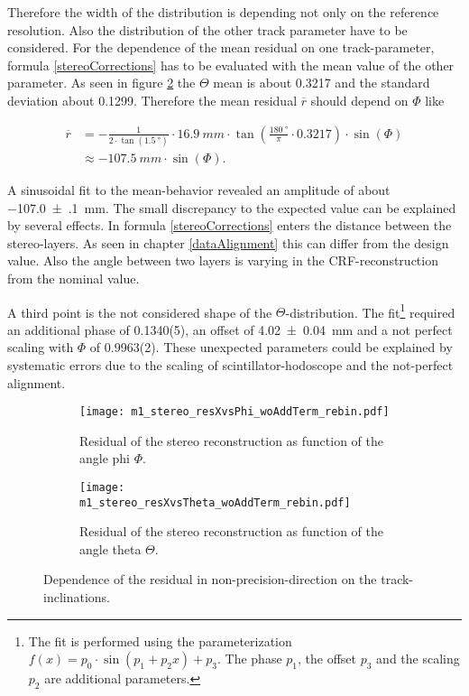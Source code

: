 \documentclass[
twoside,            %
BCOR1.4cm,          %
10pt,               %
headings=normal,    %
headsepline,        %
clearplainpage,		%
final,              %
div=14,
open=right,
bibliography=toc
]{scrreprt}
\begin{document}
Therefore the width of the distribution is depending not only on the reference resolution.
Also the distribution of the other track parameter have to be considered.
For the dependence of the mean residual on one track-parameter, formula \ref{stereoCorrections} has to be evaluated with the mean value of the other parameter.
As seen in figure \ref{resXvsTheta} the $\Theta$ mean is about 0.3217 and the standard deviation about 0.1299.
Therefore the mean residual $\overline{r}$ should depend on $\Phi$ like

\begin{align*}
	\overline{r} &= 
						- \tfrac{1}{2 \cdot \tan(\SI{1.5}{\degree})} 
						\cdot \SI{16.9}{mm} 
						\cdot \tan( \tfrac{\SI{180}{\degree}}{\pi} \cdot 0.3217) 
						\cdot \sin(\Phi)
			\\[10pt]
				   &\approx 
						-\SI{107.5}{mm} 
						\cdot \sin(\Phi).
\end{align*}

A sinusoidal fit to the mean-behavior revealed an amplitude of about \SI{-107.0(1)}{mm}.
The small discrepancy to the expected value can be explained by several effects.
In formula \ref{stereoCorrections} enters the distance between the stereo-layers.
As seen in chapter \ref{dataAlignment} this can differ from the design value.
Also the angle between two layers is varying in the CRF-reconstruction from the nominal value.

A third point is the not considered shape of the $\Theta$-distribution.
The fit\footnote{
	The fit is performed using the parameterization  $f(x) = p_{0} \cdot \sin\!\left(p_{1} + p_{2} x \right) + p_{3}$.
	The phase $p_{1}$, the offset $p_{3}$ and the scaling $p_{2}$ are additional parameters.
} required an additional phase of 0.1340(5), an offset of \SI{4.02(4)}{mm} and a not perfect scaling with $\Phi$ of 0.9963(2).
These unexpected parameters could be explained by systematic errors due to the scaling of scintillator-hodoscope and the not-perfect alignment.

\begin{figure}[!h]
	\begin{subfigure}[b]{0.48\textwidth}
		\centering
		\texttt{[image: m1\_stereo\_resXvsPhi\_woAddTerm\_rebin.pdf]}
		\caption{Residual of the stereo reconstruction as function of the angle phi $\Phi$.}
		\label{resXvsPhi} 
	\end{subfigure}
	\hfill
	\begin{subfigure}[b]{0.48\textwidth}
		\centering
		\texttt{[image: m1\_stereo\_resXvsTheta\_woAddTerm\_rebin.pdf]}
		\caption{Residual of the stereo reconstruction as function of the angle theta $\Theta$.}
		\label{resXvsTheta} 
	\end{subfigure}
	\vspace{-2mm}
	\caption{
		Dependence of the residual in non-precision-direction on the track-inclinations.
	}
	\label{stereoXwoCor}
\end{figure}
\end{document}
